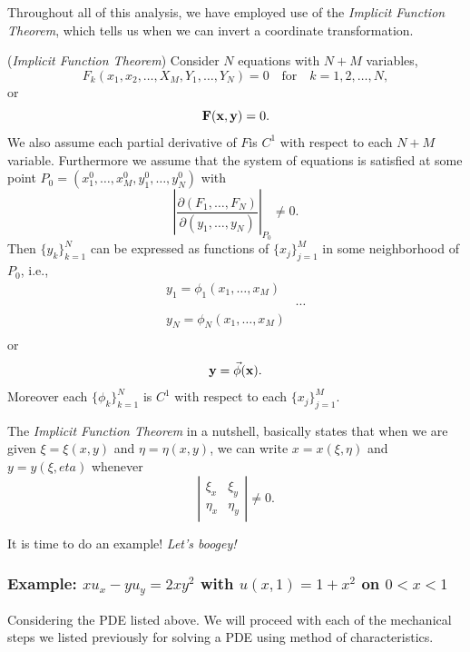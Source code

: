 Throughout all of this analysis, we have employed use of the \emph{Implicit Function Theorem}, which tells us when we can invert a coordinate transformation. 
\begin{theorem}
(\emph{Implicit Function Theorem}) Consider $N$ equations with $N+M$ variables, $$F_k(x_1,x_2,\ldots,X_M,Y_1,\ldots,Y_N) = 0 \ \ \ \mbox{ for } \ \ \ k=1,2,\ldots,N,$$
or $${\bf{F}}({\bf{x}},{\bf{y}}) = 0.$$
We also assume each partial derivative of $F$is $C^1$ with respect to each $N+M$ variable. Furthermore we assume that the system of equations is satisfied at some point $P_0 = (x_1^0,\ldots,x_M^0,y_1^0,\ldots,y_N^0)$ with $$\left| \frac{\partial(F_1,\ldots,F_N)}{\partial(y_1,\ldots,y_N)} \right|_{P_0} \neq 0.$$
Then $\{y_k\}_{k=1}^{N}$ can be expressed as functions of $\{x_j\}_{j=1}^{M}$ in some neighborhood of $P_0$, i.e.,
\begin{align*}
y_1 = \phi_1(x_1,\ldots,x_M) \\
&\cdots \\
y_N = \phi_N(x_1,\ldots,x_M) \\
\end{align*}
or $${\bf{y}} = \vec{\phi}({\bf{x}}).$$
Moreover each $\{ \phi_k \}_{k=1}^{N}$ is $C^1$ with respect to each $\{x_j\}_{j=1}^{M}.$
\end{theorem}

The \emph{Implicit Function Theorem} in a nutshell, basically states that when we are given $\xi = \xi(x,y)$ and $\eta=\eta(x,y)$, we can write $x=x(\xi,\eta)$ and $y=y(\xi,eta)$ whenever $$\left| \begin{array}{cc} \xi_x & \xi_y \\ \eta_x & \eta_y \end{array} \right| \neq 0.$$

It is time to do an example! \emph{Let's boogey!}



%
%
\subsubsection{Example: $x u_x - y u_y = 2xy^2$ with $u(x,1)=1+x^2$ on $0<x<1$}

Considering the PDE listed above. We will proceed with each of the mechanical steps we listed previously for solving a PDE using method of characteristics.

